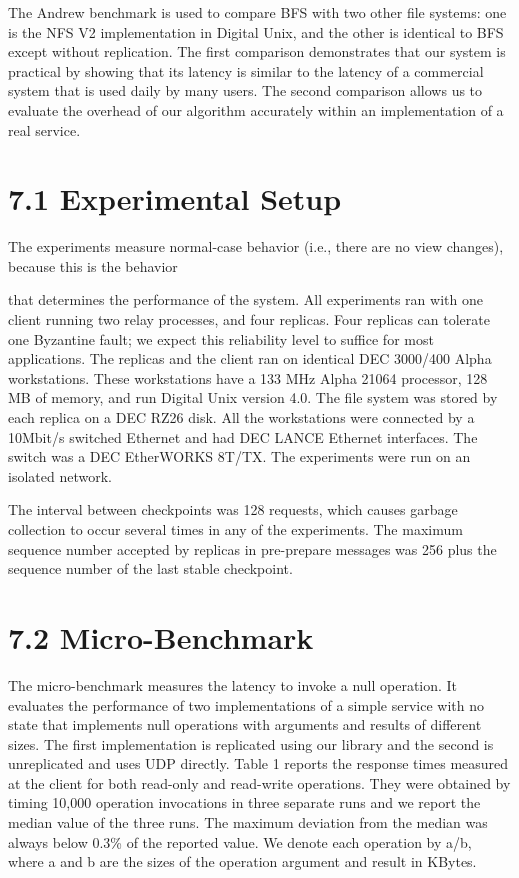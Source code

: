 \documentclass[
]{article}
\begin{document}
The Andrew benchmark is used to compare BFS with two other file systems:
one is the NFS V2 implementation in Digital Unix, and the other is
identical to BFS except without replication. The first comparison
demonstrates that our system is practical by showing that its latency is
similar to the latency of a commercial system that is used daily by many
users. The second comparison allows us to evaluate the overhead of our
algorithm accurately within an implementation of a real service.

\section{7.1 Experimental Setup}\label{experimental-setup}

The experiments measure normal-case behavior (i.e., there are no view
changes), because this is the behavior

that determines the performance of the system. All experiments ran with
one client running two relay processes, and four replicas. Four replicas
can tolerate one Byzantine fault; we expect this reliability level to
suffice for most applications. The replicas and the client ran on
identical DEC 3000/400 Alpha workstations. These workstations have a 133
MHz Alpha 21064 processor, 128 MB of memory, and run Digital Unix
version 4.0. The file system was stored by each replica on a DEC RZ26
disk. All the workstations were connected by a 10Mbit/s switched
Ethernet and had DEC LANCE Ethernet interfaces. The switch was a DEC
EtherWORKS 8T/TX. The experiments were run on an isolated network.

The interval between checkpoints was 128 requests, which causes garbage
collection to occur several times in any of the experiments. The maximum
sequence number accepted by replicas in pre-prepare messages was 256
plus the sequence number of the last stable checkpoint.

\section{7.2 Micro-Benchmark}\label{micro-benchmark}

The micro-benchmark measures the latency to invoke a null operation. It
evaluates the performance of two implementations of a simple service
with no state that implements null operations with arguments and results
of different sizes. The first implementation is replicated using our
library and the second is unreplicated and uses UDP directly. Table 1
reports the response times measured at the client for both read-only and
read-write operations. They were obtained by timing 10,000 operation
invocations in three separate runs and we report the median value of the
three runs. The maximum deviation from the median was always below 0.3\%
of the reported value. We denote each operation by a/b, where a and b
are the sizes of the operation argument and result in KBytes.
\end{document}
